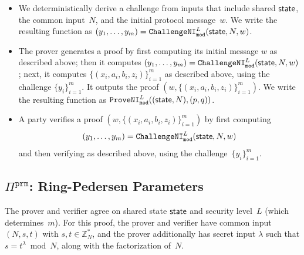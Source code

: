 \documentclass[11pt]{article}
\def\state{{\sf state}}
\newcommand{\proof}[1]{\ensuremath{\Pi^{\mathtt{#1}}}}
\newcommand{\challengeni}[1]{\ensuremath{\mathtt{ChallengeNI}_{\mathtt{#1}}}}
\newcommand{\proveni}[1]{\ensuremath{\mathtt{ProveNI}_{\mathtt{#1}}}}
\newcommand{\?}[1]{\stackrel{?}{#1}}
\begin{document}
\begin{itemize}
  \item We deterministically derive a challenge from inputs that include shared $\state$, the common input~$N$, and the initial protocol message~$w$.   
  We write the resulting function as $(y_1, \ldots, y_m)=\challengeni{mod}^L(\state, N, w)$.

  \item The prover generates a proof by first computing its initial message $w$ as described above; then it computes 
        $(y_1, \ldots, y_m) = \challengeni{mod}^L(\state, N, w)$; next, it computes $\{(x_i, a_i, b_i, z_i)\}_{i=1}^m$ as described above, using the challenge $\{y_i\}_{i=1}^m$. It outputs the proof $(w, \{(x_i, a_i, b_i, z_i)\}_{i=1}^m)$. We write the resulting function as $\proveni{mod}^L((\state, N), (p, q))$.

  \item A party verifies a proof  $(w, \{(x_i, a_i, b_i, z_i)\}_{i=1}^m)$ by first computing \[(y_1, \ldots, y_m) = \challengeni{mod}^L(\state, N, w)\] and then verifying as described above, using the challenge~$\{y_i\}_{i=1}^m$.
\end{itemize}

\subsection{$\proof{prm}$: Ring-Pedersen Parameters}
The prover and verifier agree on shared state $\state$ and security level~$L$ (which determines~$m$). 
For this proof, the prover and verifier have common input $(N, s, t)$ with $s, t \in {\mathbb Z}_N^*$, and the prover additionally has secret input $\lambda$ such that $s=t^\lambda \bmod N$, along with the factorization of~$N$.
\end{document}
